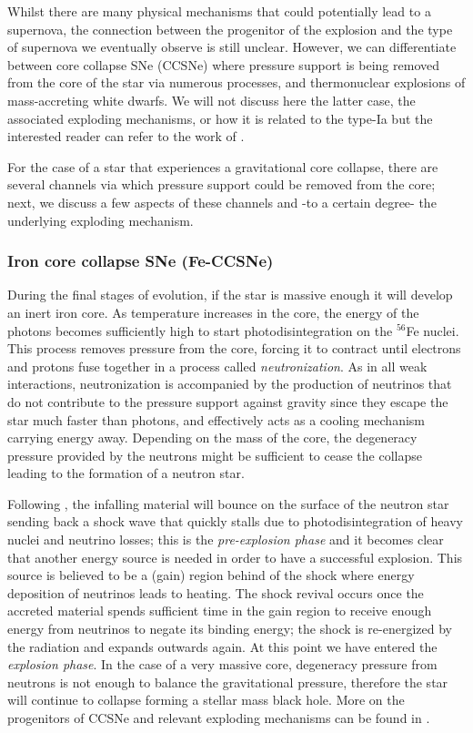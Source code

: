 \documentclass[../../main/thesis_msc.tex]{subfiles}
\begin{document}
				Whilst there are many physical mechanisms that could potentially lead to a supernova, the connection between the progenitor of the explosion and the type of supernova we eventually observe is still unclear. However, we can differentiate between core collapse SNe (CCSNe) where pressure support is being removed from the core of the star via numerous processes, and thermonuclear explosions of mass-accreting white dwarfs. We will not discuss here the latter case, the associated exploding mechanisms, or how it is related to the type-Ia but the interested reader can refer to the work of \cite{Hillebrandt2000, Wang2018, SNe_book}.
				
				For the case of a star that experiences a gravitational core collapse, there are several channels via which pressure support could be removed from the core; next, we discuss a few aspects of these channels and -to a certain degree- the underlying exploding mechanism.
				
				\subsubsection{Iron core collapse SNe (Fe-CCSNe)}
					
					During the final stages of evolution, if the star is massive enough it will develop an inert iron core. As temperature increases in the core, the energy of the photons becomes sufficiently high to start photodisintegration on the $^{56}$Fe nuclei. This process removes pressure from the core, forcing it to contract until electrons and protons fuse together in a process called \emph{neutronization}. As in all weak interactions, neutronization is accompanied by the production of neutrinos that do not contribute to the pressure support against gravity since they escape the star much faster than photons, and effectively acts as a cooling mechanism carrying energy away. Depending on the mass of the core, the degeneracy pressure provided by the neutrons might be sufficient to cease the collapse leading to the formation of a neutron star. 
					
					Following \cite{Muller2016}, the infalling material will bounce on the surface of the neutron star sending back a shock wave that quickly stalls due to photodisintegration of heavy nuclei and neutrino losses; this is the \emph{pre-explosion phase} and it becomes clear that another energy source is needed in order to have a successful explosion. This source is believed to be a (gain) region behind of the shock where energy deposition of neutrinos leads to heating. The shock revival occurs once the accreted material spends sufficient time in the gain region to receive enough energy from neutrinos to negate its binding energy; the shock is re-energized by the radiation and expands outwards again. At this point we have entered the \emph{explosion phase}. In the case of a very massive core, degeneracy pressure from neutrons is not enough to balance the gravitational pressure, therefore the star will continue to collapse forming a stellar mass black hole. More on the progenitors of CCSNe and relevant exploding mechanisms can be found in \cite{Smartt2009, Couch2017}.
\end{document}
